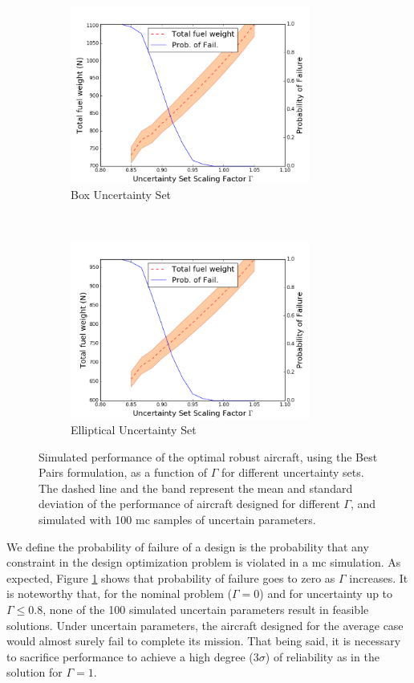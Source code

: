 \begin{figure}[ht]
    \centering
    \captionsetup{justification=centering, font=small}
    \begin{subfigure}{0.49\textwidth}
        \centering
        \includegraphics[height=2.3in]{signomial_simple_flight/box_best_pairs.png}
         \caption{Box Uncertainty Set}
    \end{subfigure}%
    ~ 
    \begin{subfigure}{0.49\textwidth}
        \centering
        \includegraphics[height=2.3in]{signomial_simple_flight/ell_best_pairs.png}
         \caption{Elliptical Uncertainty Set}
    \end{subfigure}
    \caption{Simulated performance of the optimal robust aircraft, using the Best Pairs formulation,
    as a function of $\Gamma$ for different uncertainty sets.
    The dashed line and the band represent the mean and standard deviation of the performance
    of aircraft designed for different $\Gamma$,
    and simulated with 100 \gls{mc} samples of uncertain parameters.}
    \label{fig:probOfFailure}
\end{figure}

We define the probability of failure of a design is the probability that any constraint
in the design optimization problem is violated in a \gls{mc} simulation.
As expected, Figure \ref{fig:probOfFailure} shows that probability of failure goes to zero as $\Gamma$ increases.
It is noteworthy that, for the nominal problem ($\Gamma = 0$) and for uncertainty up to $\Gamma \leq 0.8$, none of
the 100 simulated uncertain parameters result in feasible solutions. Under uncertain parameters,
the aircraft designed for the average case would almost surely fail to complete its mission.
That being said, it is necessary to sacrifice performance to achieve a high degree ($3\sigma$) of
reliability as in the solution for $\Gamma = 1$.

